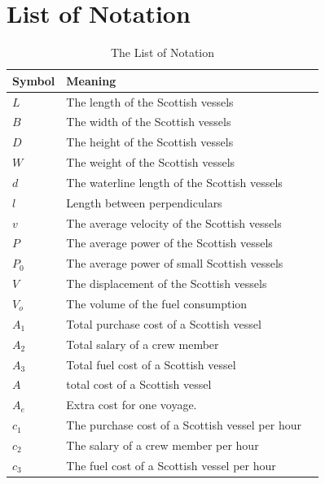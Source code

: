 \documentclass{mcmthesis}
\begin{document}
\section{List of Notation}

\begin{center}
\begin{longtable}{p{}p{}m{}}
\caption{The List of Notation}\\
\hline
Symbol& Meaning \\
\hline

$L$      & The length of the Scottish vessels \\
$B$      & The width of the Scottish vessels 
                                                          \\
$D$     & The height of the Scottish vessels 
                                                        \\
$W$     & The weight of the Scottish vessels 
                                                        \\
$d$      & The   waterline length of the Scottish vessels \\
$l$       & Length between perpendiculars                                                           \\
$v$      & The average velocity  of the Scottish vessels                                            \\
$P$      & The average power of the Scottish vessels\\
$P_0$      & The average power of small Scottish vessels\\    
                                     
$V$      & The displacement of the Scottish vessels 
                                                          \\
$V_o$      & The volume of the fuel consumption
                                                          \\
$A_1$     & Total purchase cost of a Scottish vessel
                                                        \\
$A_2$       & Total salary of a crew member                                                           \\
$A_3$      & Total fuel cost of a Scottish vessel                                        \\
$A$      & total cost of a Scottish vessel                                        \\
$A_e$      &Extra cost for one voyage.  \\
$c_1$     & The purchase cost of a Scottish vessel per hour
                                                        \\
$c_2$       & The salary of a crew member per hour                                                     \\
$c_3$      & The fuel cost of a Scottish vessel per hour                                       \\


\end{longtable}
\end{center}
\end{document}

